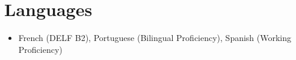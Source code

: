 \section{Languages}
	\begin{itemize}[leftmargin=0.15in, label={}]
		\item French (DELF B2), Portuguese (Bilingual Proficiency), Spanish (Working Proficiency)
	\end{itemize}